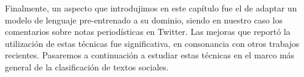 Finalmente, un aspecto que introdujimos en este capítulo fue el de adaptar un modelo de lenguaje pre-entrenado a su dominio, siendo en nuestro caso los comentarios sobre notas periodísticas en Twitter. Las mejoras que reportó la utilización de estas técnicas fue significativa, en consonancia con otros trabajos recientes. Pasaremos a continuación a estudiar estas técnicas en el marco más general de la clasificación de textos sociales.
